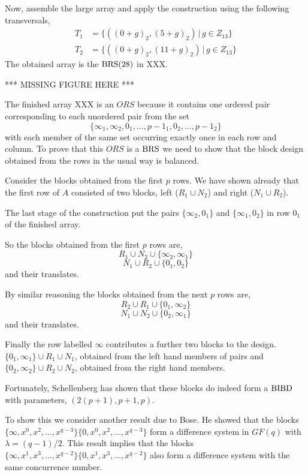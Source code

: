 \begin{example}
Now, assemble the large array and apply the construction using the following transversals,
\begin{align}
  T_1 &= \{((0 + g)_2, (5 + g)_2)\, |\, g \in Z_{13}\} \\
  T_2 &= \{((0 + g)_2, (11 + g)_2)\, |\, g \in Z_{13}\}
\end{align}
The obtained array is the $\operatorname{BRS}(28)$ in XXX.

*** MISSING FIGURE HERE ***

The finished array XXX is an $ORS$ because it contains one ordered pair corresponding to each unordered pair from the set
\begin{equation}
\{\infty _1, \infty _2, 0_1, \ldots, p - 1_1, 0_2, \ldots, p - 1_2\}
\end{equation}
with each member of the same set occurring exactly once in each row and column.
To prove that this $ORS$ is a $\operatorname{BRS}$ we need to show that the block design obtained from the rows in the usual way is balanced.

Consider the blocks obtained from the first $p$ rows.
We have shown already that the first row of $A$ consisted of two blocks, left ($R_1 \cup N_2$) and right ($N_1 \cup R_2$).

The last stage of the construction put the pairs $\{\infty _2, 0_1\}$ and $\{\infty _1,0_2\}$ in row $0_1$ of the finished array.

So the blocks obtained from the first $p$ rows are,
\begin{equation}
  R_1 \cup N_2 \cup \{\infty _2, \infty _1 \}
\end{equation}
\begin{equation}
  N_1 \cup R_2 \cup \{0 _1, 0 _2 \}
\end{equation}
and their translates.

By similar reasoning the blocks obtained from the next $p$ rows are,
\begin{equation}
  R_2 \cup R_1 \cup \{0 _1, \infty _2 \}
\end{equation}
\begin{equation}
  N_1 \cup N_2 \cup \{0 _2, \infty _1 \}
\end{equation}
and their translates.

Finally the row labelled $\infty$ contributes a further two blocks to the design.
$\{0_1, \infty _1\} \cup R_1 \cup N_1$, obtained from the left hand members of pairs and $\{0_2, \infty _2\} \cup R_2 \cup N_2$, obtained from the right hand members.

Fortunately, Schellenberg has shown that these blocks do indeed form a $\operatorname{BIBD}$ with parameters, $(2(p + 1), p + 1, p)$.

To show this we consider another result due to Bose.
He showed that the blocks
$\{\infty, x^0, x^2, \ldots, x^{q - 3}\}\{0, x^0, x^2, \ldots, x^{q - 3}\}$
form a difference system in $GF(q)$ with
$\lambda = (q - 1)/2$.
This result implies that the blocks
$\{\infty, x^1, x^3, \ldots, x^{q - 2}\}\{0, x^1, x^3, \ldots, x^{q - 2}\}$
also form a difference system with the same concurrence number.
\end{example}

